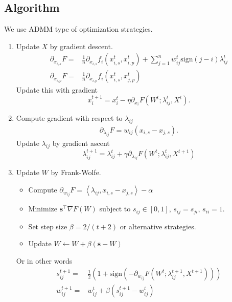 \documentclass{article}
\begin{document}
\subsection{Algorithm}
We use ADMM type of optimization strategies.

\begin{enumerate}
  \item Update $X$ by gradient descent.
  \begin{align}
    \partial_{x_{i,s}} F =& \frac{1}{n}\partial_{x_{i,s}} f_i(x^t_{i,s},x^t_{i,p}) + \sum_{j=1}^n w^t_{ij} \text{sign}(j-i) \lambda^t_{ij}  \\
    \partial_{x_{i,p}} F =& \frac{1}{n}\partial_{x_{i,p}} f_i(x^t_{i,s},x^t_{j,p})
  \end{align}
  Update this with gradient
  \begin{equation}
    x_{i}^{t+1} = x_i^t - \eta \partial_{x_{i}} F(W^t;\lambda_{ij}^t, X^t).
  \end{equation}
  \item Compute gradient with respect to $\lambda_{ij}$
  \begin{align}
    \partial_{\lambda_{ij}} F = w_{ij} (x_{i,s} - x_{j,s}).
  \end{align}
  Update $\lambda_{ij}$ by gradient ascent
  \begin{equation}
    \lambda_{ij}^{t+1} = \lambda_{ij}^t + \gamma \partial_{\lambda_{ij}} F(W^t;\lambda_{ij}^t, X^{t+1})
  \end{equation}
  \item Update $W$ by Frank-Wolfe.
  \begin{itemize}
    \item Compute $\partial_{w_{ij}} F = \left<\lambda_{ij}, x_{i,s} - x_{j,s} \right> - \alpha$
    \item Minimize $\mathbf{s}^\top \nabla F(W)$ subject to $s_{ij} \in [0,1]$, $s_{ij}=s_{ji}$, $s_{ii}=1$.
    \item Set step size $\beta=2/(t+2)$ or alternative strategies.
    \item Update $W\leftarrow W + \beta(\mathbf{s} - W)$
  \end{itemize}
  Or in other words
  \begin{align}
    s_{ij}^{t+1} =& \tfrac{1}{2} \left(1+\text{sign}\left( - \partial_{w_{ij}} F(W^t; \lambda_{ij}^{t+1}, X^{t+1})\right) \right) \\
    w_{ij}^{t+1} =& w_{ij}^t + \beta(s_{ij}^{t+1} - w_{ij}^t)
  \end{align}
\end{enumerate}
\end{document}

